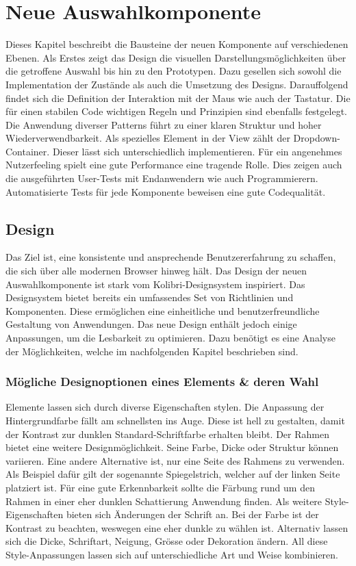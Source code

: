 \chapter{Neue Auswahlkomponente}
\label{chap:newComponent}

Dieses Kapitel beschreibt die Bausteine der neuen Komponente auf verschiedenen Ebenen. 
Als Erstes zeigt das Design die visuellen Darstellungsmöglichkeiten über die getroffene Auswahl bis hin zu den Prototypen. 
Dazu gesellen sich sowohl die Implementation der Zustände als auch die Umsetzung des Designs.
Darauffolgend findet sich die Definition der Interaktion mit der Maus wie auch der Tastatur. 
Die für einen stabilen Code wichtigen Regeln und Prinzipien sind ebenfalls festgelegt. 
Die Anwendung diverser Patterns führt zu einer klaren Struktur und hoher Wiederverwendbarkeit. 
Als spezielles Element in der View zählt der Dropdown-Container. 
Dieser lässt sich unterschiedlich implementieren. 
Für ein angenehmes Nutzerfeeling spielt eine gute Performance eine tragende Rolle. 
Dies zeigen auch die ausgeführten User-Tests mit Endanwendern wie auch Programmierern. 
Automatisierte Tests für jede Komponente beweisen eine gute Codequalität. 


\section{Design}
\label{sec:design}

Das Ziel ist, eine konsistente und ansprechende Benutzererfahrung zu schaffen, die sich über alle modernen Browser hinweg hält. 
Das Design der neuen Auswahlkomponente ist stark vom Kolibri-Designsystem inspiriert. 
Das Designsystem bietet bereits ein umfassendes Set von Richtlinien und Komponenten. 
Diese ermöglichen eine einheitliche und benutzerfreundliche Gestaltung von Anwendungen. 
Das neue Design enthält jedoch einige Anpassungen, um die Lesbarkeit zu optimieren. 
Dazu benötigt es eine Analyse der Möglichkeiten, welche im nachfolgenden Kapitel beschrieben sind. 


\subsection{Mögliche Designoptionen eines Elements \& deren Wahl}
\label{sec:possibleDesignOptions}

Elemente lassen sich durch diverse Eigenschaften stylen. 
Die Anpassung der Hintergrundfarbe fällt am schnellsten ins Auge. 
Diese ist hell zu gestalten, damit der Kontrast zur dunklen Standard-Schriftfarbe erhalten bleibt. 
Der Rahmen bietet eine weitere Designmöglichkeit. 
Seine Farbe, Dicke oder Struktur können variieren. 
Eine andere Alternative ist, nur eine Seite des Rahmens zu verwenden. 
Als Beispiel dafür gilt der sogenannte Spiegelstrich, welcher auf der linken Seite platziert ist. 
Für eine gute Erkennbarkeit sollte die Färbung rund um den Rahmen in einer eher dunklen Schattierung Anwendung finden. 
Als weitere Style-Eigenschaften bieten sich Änderungen der Schrift an. 
Bei der Farbe ist der Kontrast zu beachten, weswegen eine eher dunkle zu wählen ist. 
Alternativ lassen sich die Dicke, Schriftart, Neigung, Grösse oder Dekoration ändern. 
All diese Style-Anpassungen lassen sich auf unterschiedliche Art und Weise kombinieren. 

